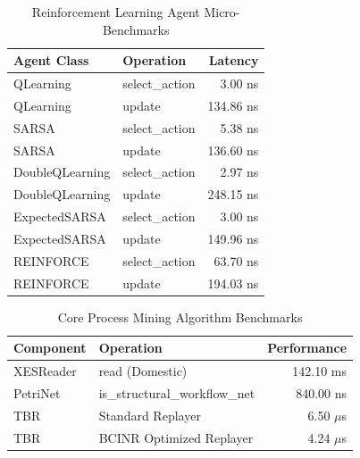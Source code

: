 \begin{table}[ht]
\centering
\begin{tabular}{llr}
\toprule
Agent Class & Operation & Latency \\
\midrule
QLearning & select\_action & 3.00 ns \\
QLearning & update & 134.86 ns \\
SARSA & select\_action & 5.38 ns \\
SARSA & update & 136.60 ns \\
DoubleQLearning & select\_action & 2.97 ns \\
DoubleQLearning & update & 248.15 ns \\
ExpectedSARSA & select\_action & 3.00 ns \\
ExpectedSARSA & update & 149.96 ns \\
REINFORCE & select\_action & 63.70 ns \\
REINFORCE & update & 194.03 ns \\
\bottomrule
\end{tabular}
\caption{Reinforcement Learning Agent Micro-Benchmarks}
\label{tab:agent_performance}
\end{table}

\begin{table}[ht]
\centering
\begin{tabular}{llr}
\toprule
Component & Operation & Performance \\
\midrule
XESReader & read (Domestic) & 142.10 ms \\
PetriNet & is\_structural\_workflow\_net & 840.00 ns \\
TBR & Standard Replayer & 6.50 $\mu$s \\
TBR & BCINR Optimized Replayer & 4.24 $\mu$s \\
\bottomrule
\end{tabular}
\caption{Core Process Mining Algorithm Benchmarks}
\label{tab:algo_performance}
\end{table}
